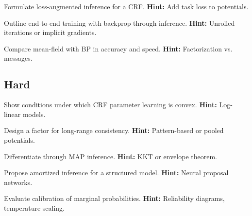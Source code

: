 \begin{problem}
Formulate loss-augmented inference for a CRF.
\textbf{Hint:} Add task loss to potentials.
\end{problem}

\begin{problem}
Outline end-to-end training with backprop through inference.
\textbf{Hint:} Unrolled iterations or implicit gradients.
\end{problem}

\begin{problem}[Approximation]
Compare mean-field with BP in accuracy and speed.
\textbf{Hint:} Factorization vs. messages.
\end{problem}

\subsection*{Hard}
\begin{problem}[Convexity]
Show conditions under which CRF parameter learning is convex.
\textbf{Hint:} Log-linear models.
\end{problem}

\begin{problem}
Design a factor for long-range consistency.
\textbf{Hint:} Pattern-based or pooled potentials.
\end{problem}

\begin{problem}
Differentiate through MAP inference.
\textbf{Hint:} KKT or envelope theorem.
\end{problem}

\begin{problem}
Propose amortized inference for a structured model.
\textbf{Hint:} Neural proposal networks.
\end{problem}

\begin{problem}[Calibration]
Evaluate calibration of marginal probabilities.
\textbf{Hint:} Reliability diagrams, temperature scaling.
\end{problem}


